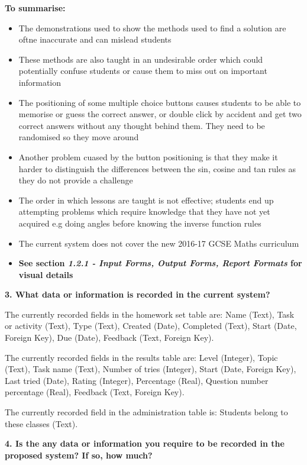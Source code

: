 \textbf{To summarise: }

\begin{itemize}
	\item The demonstrations used to show the methods used to find a solution are oftne inaccurate and can mislead students
	\item These methods are also taught in an undesirable order which could potentially confuse students or cause them to miss out on important information 
	\item The positioning of some multiple choice buttons causes students to be able to memorise or guess the correct answer, or double click by accident and get two correct answers without any thought behind them. They need to be randomised so they move around
	\item Another problem cuased by the button positioning is that they make it harder to distinguish the differences between the sin, cosine and tan rules as they do not provide a challenge
	\item The order in which lessons are taught is not effective; students end up attempting problems which require knowledge that they have not yet acquired e.g doing angles before knowing the inverse function rules
	\item The current system does not cover the new 2016-17 GCSE Maths curriculum
	\item \textbf{See section \textit{1.2.1 - Input Forms, Output Forms, Report Formats} for visual details}
\end{itemize}

\textbf{3. What data or information is recorded in the current system?}

The currently recorded fields in the homework set table are: Name (Text), Task or activity (Text), Type (Text), Created (Date), Completed (Text), Start (Date, Foreign Key), Due (Date), Feedback (Text, Foreign Key).

The currently recorded fields in the results table are: Level (Integer), Topic (Text), Task name (Text), Number of tries (Integer), Start (Date, Foreign Key), Last tried (Date), Rating (Integer), Percentage (Real), Question number percentage (Real), Feedback (Text, Foreign Key).

The currently recorded field in the administration table is: Students belong to these classes (Text).

\textbf{4. Is the any data or information you require to be recorded in the proposed system? If so, how much?}

